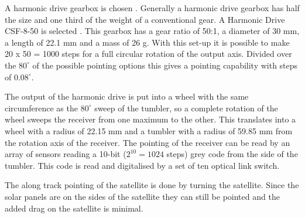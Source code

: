 A harmonic drive gearbox is chosen \cite{harmonicdrive}. Generally a harmonic drive gearbox has half the size and one third of the weight of a conventional gear. A Harmonic Drive CSF-8-50 is selected \cite{harmweb}. This gearbox has a gear ratio of 50:1, a diameter of 30 mm, a length of 22.1 mm and a mass of 26 g. With this set-up it is possible to make 20 x 50 = 1000 steps for a full circular rotation of the output axis. Divided over the $80^\circ$ of the possible pointing options this gives a pointing capability with steps of $0.08^\circ$.

The output of the harmonic drive is put into a wheel with the same circumference as the $80^\circ$ sweep of the tumbler, so a complete rotation of the wheel sweeps the receiver from one maximum to the other. This translates into a wheel with a radius of 22.15 mm and a tumbler with a radius of 59.85 mm from the rotation axis of the receiver. The pointing of the receiver can be read by an array of sensors reading a 10-bit ($2^10 = 1024$ steps) grey code from the side of the tumbler. This code is read and digitalised by a set of ten optical link switch.

The along track pointing of the satellite is done by turning the satellite. Since the solar panels are on the sides of the satellite they can still be pointed and the added drag on the satellite is minimal. 
